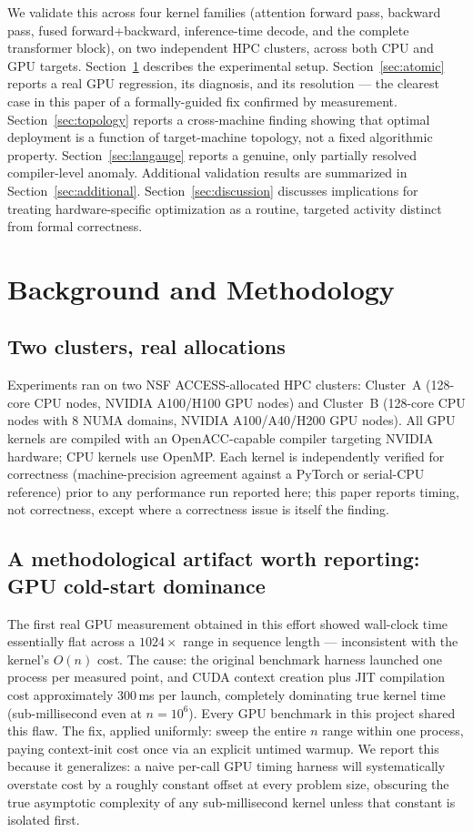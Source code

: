 \documentclass[conference]{IEEEtran}
\begin{document}
We validate this across four kernel families (attention forward pass,
backward pass, fused forward+backward, inference-time decode, and the
complete transformer block), on two independent HPC clusters, across
both CPU and GPU targets. Section~\ref{sec:method} describes the
experimental setup. Section~\ref{sec:atomic} reports a real GPU
regression, its diagnosis, and its resolution --- the clearest case in
this paper of a formally-guided fix confirmed by measurement.
Section~\ref{sec:topology} reports a cross-machine finding showing that
optimal deployment is a function of target-machine topology, not a
fixed algorithmic property. Section~\ref{sec:langauge} reports a
genuine, only partially resolved compiler-level anomaly. Additional
validation results are summarized in Section~\ref{sec:additional}.
Section~\ref{sec:discussion} discusses implications for treating
hardware-specific optimization as a routine, targeted activity distinct
from formal correctness.

\section{Background and Methodology}
\label{sec:method}

\subsection{Two clusters, real allocations}

Experiments ran on two NSF ACCESS-allocated HPC clusters: Cluster~A
(128-core CPU nodes, NVIDIA A100/H100 GPU nodes) and Cluster~B
(128-core CPU nodes with 8 NUMA domains, NVIDIA A100/A40/H200 GPU
nodes). All GPU kernels are compiled with an OpenACC-capable compiler
targeting NVIDIA hardware; CPU kernels use OpenMP. Each kernel is
independently verified for correctness (machine-precision agreement
against a PyTorch or serial-CPU reference) prior to any performance
run reported here; this paper reports timing, not correctness, except
where a correctness issue is itself the finding.

\subsection{A methodological artifact worth reporting: GPU cold-start dominance}
\label{sec:coldstart}

The first real GPU measurement obtained in this effort showed
wall-clock time essentially flat across a $1024\times$ range in
sequence length --- inconsistent with the kernel's $O(n)$ cost. The
cause: the original benchmark harness launched one process per measured
point, and CUDA context creation plus JIT compilation cost
approximately 300\,ms per launch, completely dominating true kernel
time (sub-millisecond even at $n=10^6$). Every GPU benchmark in this
project shared this flaw. The fix, applied uniformly: sweep the entire
$n$ range within one process, paying context-init cost once via an
explicit untimed warmup. We report this because it generalizes: a
naive per-call GPU timing harness will systematically overstate cost by
a roughly constant offset at every problem size, obscuring the true
asymptotic complexity of any sub-millisecond kernel unless that
constant is isolated first.
\end{document}
